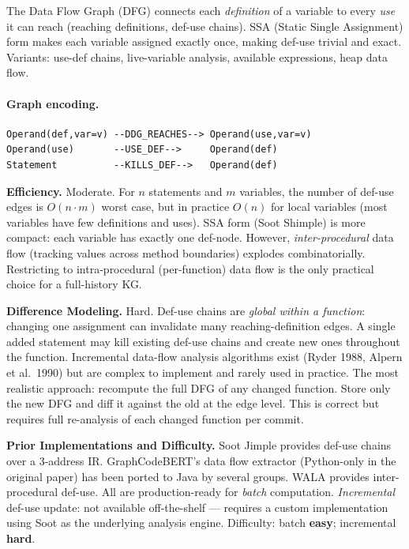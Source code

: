 \documentclass[12pt,a4paper]{article}
\begin{document}
The Data Flow Graph (DFG) connects each \emph{definition} of a variable to
every \emph{use} it can reach (reaching definitions, def-use chains). SSA
(Static Single Assignment) form makes each variable assigned exactly once,
making def-use trivial and exact. Variants: use-def chains, live-variable
analysis, available expressions, heap data flow.

\paragraph{Graph encoding.}
\begin{lstlisting}
Operand(def,var=v) --DDG_REACHES--> Operand(use,var=v)
Operand(use)       --USE_DEF-->     Operand(def)
Statement          --KILLS_DEF-->   Operand(def)
\end{lstlisting}

\begin{effbox}
\textbf{Efficiency.}
Moderate. For $n$ statements and $m$ variables, the number of def-use edges
is $O(n \cdot m)$ worst case, but in practice $O(n)$ for local variables (most
variables have few definitions and uses). SSA form (Soot Shimple) is more
compact: each variable has exactly one def-node. However, \emph{inter-procedural}
data flow (tracking values across method boundaries) explodes combinatorially.
Restricting to intra-procedural (per-function) data flow is the only practical
choice for a full-history KG.
\end{effbox}

\begin{diffbox}
\textbf{Difference Modeling.}
Hard. Def-use chains are \emph{global within a function}: changing one assignment
can invalidate many reaching-definition edges. A single added statement may
kill existing def-use chains and create new ones throughout the function.
Incremental data-flow analysis algorithms exist (Ryder 1988, Alpern et al.\
1990) but are complex to implement and rarely used in practice. The most
realistic approach: recompute the full DFG of any changed function. Store only
the new DFG and diff it against the old at the edge level. This is correct but
requires full re-analysis of each changed function per commit.
\end{diffbox}

\begin{implbox}
\textbf{Prior Implementations and Difficulty.}
Soot Jimple provides def-use chains over a 3-address IR. GraphCodeBERT's data
flow extractor (Python-only in the original paper) has been ported to Java by
several groups. WALA provides inter-procedural def-use. All are
production-ready for \emph{batch} computation. \emph{Incremental} def-use
update: not available off-the-shelf --- requires a custom implementation
using Soot as the underlying analysis engine. Difficulty: batch
\textbf{easy}; incremental \textbf{hard}.
\end{implbox}
\end{document}
